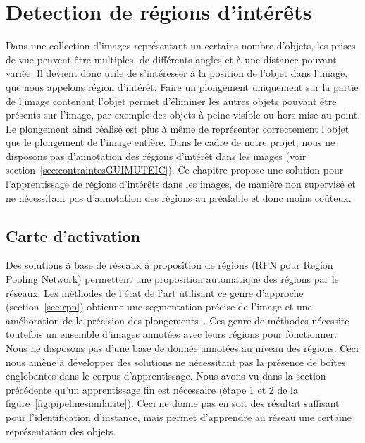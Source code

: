 \chapter{Detection de régions d'intérêts }
\label{chap:regions}

Dans une collection d'images représentant un certains nombre d'objets, les prises de vue peuvent être multiples, de différents angles et à une distance pouvant variée. 
Il devient donc utile de s'intéresser à la position de l'objet dans l'image, que nous appelons région d'intérêt.
Faire un plongement uniquement sur la partie de l'image contenant l'objet permet d'éliminer les autres objets pouvant être présents sur l'image, par exemple des objets à peine visible ou hors mise au point.
Le plongement ainsi réalisé est plus à même de représenter correctement l'objet que le plongement de l'image entière.
Dans le cadre de notre projet, nous ne disposons pas d'annotation des régions d'intérêt dans les images (voir section~\ref{sec:contraintesGUIMUTEIC}). 
Ce chapitre propose une solution pour l'apprentissage de régions d'intérêts dans les images, de manière non supervisé et ne nécessitant pas d'annotation des régions au préalable et donc moins coûteux.

\section{Carte d'activation}

Des solutions à base de réseaux à proposition de régions (RPN pour Region Pooling Network) permettent une proposition automatique des régions par le réseaux. 
Les méthodes de l'état de l'art utilisant ce genre d'approche (section~\ref{sec:rpn}) obtienne une segmentation précise de l'image et une amélioration de la précision des plongements~\cite{gordo2016deep}.
Ces genre de méthodes nécessite toutefois un ensemble d'images annotées avec leurs régions pour fonctionner. 
Nous ne disposons pas d'une base de donnée annotées au niveau des régions. 
Ceci nous amène à développer des solutions ne nécessitant pas la présence de boîtes englobantes dans le corpus d'apprentissage.
Nous avons vu dans la section précédente qu'un apprentissage fin est nécessaire (étape 1 et 2 de la figure~\ref{fig:pipelinesimilarite}).
Ceci ne donne pas en soit des résultat suffisant pour l'identification d'instance, mais permet d'apprendre au réseau une certaine représentation des objets.

